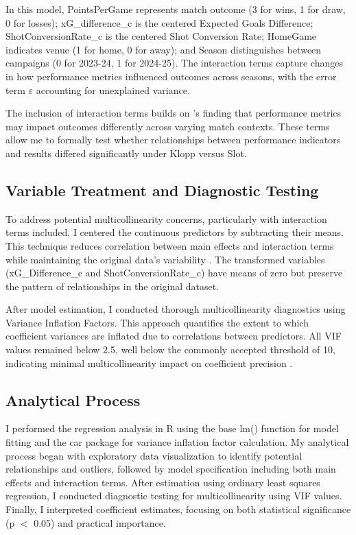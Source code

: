 \documentclass[12pt]{article}
\begin{document}
In this model, PointsPerGame represents match outcome (3 for wins, 1 for draw, 0 for losses); xG\_difference\_c is the centered Expected Goals Difference; ShotConversionRate\_c is the centered Shot Conversion Rate; HomeGame indicates venue (1 for home, 0 for away); and Season distinguishes between campaigns (0 for 2023-24, 1 for 2024-25). The interaction terms capture changes in how performance metrics influenced outcomes across seasons, with the error term $\varepsilon$ accounting for unexplained variance.

The inclusion of interaction terms builds on \citet{isik2020}'s finding that performance metrics may impact outcomes differently across varying match contexts. These terms allow me to formally test whether relationships between performance indicators and results differed significantly under Klopp versus Slot.

\subsection*{Variable Treatment and Diagnostic Testing}

To address potential multicollinearity concerns, particularly with interaction terms included, I centered the continuous predictors by subtracting their means. This technique reduces correlation between main effects and interaction terms while maintaining the original data's variability \citep{roccetti2024}. The transformed variables (xG\_Difference\_c and ShotConversionRate\_c) have means of zero but preserve the pattern of relationships in the original dataset.

After model estimation, I conducted thorough multicollinearity diagnostics using Variance Inflation Factors. This approach quantifies the extent to which coefficient variances are inflated due to correlations between predictors. All VIF values remained below 2.5, well below the commonly accepted threshold of 10, indicating minimal multicollinearity impact on coefficient precision \citep{obrien2007}.

\subsection*{Analytical Process}

I performed the regression analysis in R using the base lm() function for model fitting and the car package for variance inflation factor calculation. My analytical process began with exploratory data visualization to identify potential relationships and outliers, followed by model specification including both main effects and interaction terms. After estimation using ordinary least squares regression, I conducted diagnostic testing for multicollinearity using VIF values. Finally, I interpreted coefficient estimates, focusing on both statistical significance (p $<$ 0.05) and practical importance.
\end{document}
